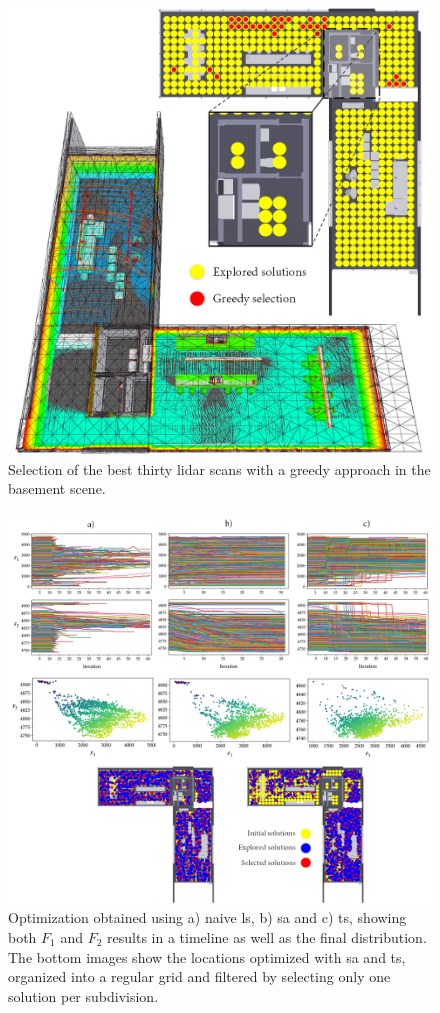 \begin{figure}
    \centering
    \includegraphics[width=.8\linewidth]{figs/lidar_optimization/greedy_results.png}
	\caption{Selection of the best thirty \acrshort{lidar} scans with a greedy approach in the basement scene.}
	\label{fig:greedy_results}
\end{figure}

\begin{figure}
    \centering
    \includegraphics[width=.9\linewidth]{figs/lidar_optimization/local_search_results.png}
	\caption{Optimization obtained using a) naive \acrshort{ls}, b) \acrshort{sa} and c) \acrshort{ts}, showing both $F_1$ and $F_2$ results in a timeline as well as the final distribution. The bottom images show the locations optimized with \acrshort{sa} and \acrshort{ts}, organized into a regular grid and filtered by selecting only one solution per subdivision.}
	\label{fig:local_search_results}
\end{figure}

